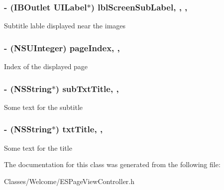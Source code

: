 \subsubsection[{lbl\+Screen\+Sub\+Label}]{\setlength{\rightskip}{0pt plus 5cm}-\/ (I\+B\+Outlet U\+I\+Label$\ast$) lbl\+Screen\+Sub\+Label\hspace{0.3cm}{\ttfamily [read]}, {\ttfamily [write]}, {\ttfamily [nonatomic]}, {\ttfamily [strong]}}\label{interface_e_s_page_view_controller_ac253c976e1b82035d6205b1abcbe18bc}
Subtitle lable displayed near the images \hypertarget{interface_e_s_page_view_controller_acd8b6a09ffbec0851c2a21f82ff4cb59}{}
\subsubsection[{page\+Index}]{\setlength{\rightskip}{0pt plus 5cm}-\/ (N\+S\+U\+Integer) page\+Index\hspace{0.3cm}{\ttfamily [read]}, {\ttfamily [write]}, {\ttfamily [atomic]}}\label{interface_e_s_page_view_controller_acd8b6a09ffbec0851c2a21f82ff4cb59}
Index of the displayed page \hypertarget{interface_e_s_page_view_controller_aa2a08bb2eb5012b0c731fc14954114a8}{}
\subsubsection[{sub\+Txt\+Title}]{\setlength{\rightskip}{0pt plus 5cm}-\/ (N\+S\+String$\ast$) sub\+Txt\+Title\hspace{0.3cm}{\ttfamily [read]}, {\ttfamily [write]}, {\ttfamily [atomic]}}\label{interface_e_s_page_view_controller_aa2a08bb2eb5012b0c731fc14954114a8}
Some text for the subtitle \hypertarget{interface_e_s_page_view_controller_a6bdeac95e5afc8ef09c069a9d32e80bc}{}
\subsubsection[{txt\+Title}]{\setlength{\rightskip}{0pt plus 5cm}-\/ (N\+S\+String$\ast$) txt\+Title\hspace{0.3cm}{\ttfamily [read]}, {\ttfamily [write]}, {\ttfamily [atomic]}}\label{interface_e_s_page_view_controller_a6bdeac95e5afc8ef09c069a9d32e80bc}
Some text for the title 

The documentation for this class was generated from the following file\+:\begin{DoxyCompactItemize}
\item 
Classes/\+Welcome/E\+S\+Page\+View\+Controller.\+h\end{DoxyCompactItemize}
